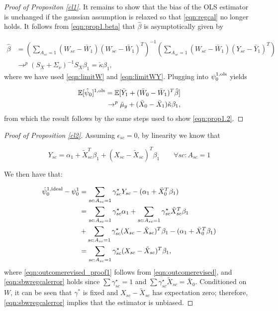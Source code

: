\begin{proof}[Proof of Propositon \ref{cl1}]
It remains to show that the bias of the OLS estimator is unchanged if the gaussian assumption is relaxed so that \eqref{eqn:regcal} no longer holds. It follows from \eqref{eqn:prop1.beta} that $\hat{\beta}$ is asymptotically given by

    \begin{align*}
    \hat{\beta} &= \left(\sum_{A_{sc}=1} (W_{sc} - \bar{W}_1)(W_{sc} - \bar{W}_1)^T \right)^{-1} \left(\sum_{A_{sc}=1} (W_{sc} - \bar{W}_1)(Y_{sc} - \bar{Y}_1)^T\right) \\
     & \rightarrow^p  (S_X + \Sigma_\nu)^{-1}S_X \beta_1 = \check{\kappa} \beta_1, 
    \end{align*}
where we have used \eqref{eqn:limitW} and \eqref{eqn:limitWY}. Plugging into $\psi_0^{1,\textup{ols}}$ yields

\begin{align*}    
    \mathbb{E}[\hat{\psi}_0]^{1,\textup{ols}} = \mathbb{E}[ \bar{Y}_1 + (\bar{W}_0 - \bar{W}_1)^T \hat{\beta}] \\
    \rightarrow^p  \bar{\mu}_y + (\bar{X}_0 - \bar{X}_1)\check{\kappa} \beta_1,
\end{align*}
from which the result follows by the same steps used to show \eqref{eqn:prop1.2}.

\end{proof}


\begin{proof}[Proof of Proposition \ref{cl2}]
Assuming $\epsilon_{sc} = 0$, by linearity we know that

\begin{equation}\label{eqn:outcomerevised}
Y_{sc} = \alpha_1 + \tilde{X}_{sc}^T\beta_1 + (X_{sc} - \tilde{X}_{sc})^T\beta_1 \qquad \forall sc: A_{sc} = 1
\end{equation}

We then have that:

\begin{align}\nonumber
    \hat{\psi}_0^{1,\textup{ideal}} - \psi_0^1 &= \sum_{sc: A_{sc} = 1}\gamma_{sc}^\star Y_{sc} - (\alpha_1 + \bar{X}_0^T\beta_1) \\
    \nonumber &= \sum_{sc: A_{sc} = 1}\gamma_{sc}^\star\alpha_1 + \sum_{sc: A_{sc} = 1}\gamma_{sc}^\star\tilde{X}_{sc}^T\beta_1 \\ 
    &+ \sum_{sc: A_{sc} = 1}\gamma_{sc}^\star(X_{sc} - \tilde{X}_{sc})^T\beta_1 - (\alpha_1 + \bar{X}_0^T\beta_1) \label{eqn:outcomerevised_proof1}\\
    &= \sum_{sc: A_{sc} = 1}\gamma_{sc}^\star(X_{sc} - \tilde{X}_{sc})^T\beta_1\label{eqn:sbwregcalerror},
\end{align}
where \eqref{eqn:outcomerevised_proof1} follows from \eqref{eqn:outcomerevised}, and \eqref{eqn:sbwregcalerror} holds since $\sum \gamma_{sc}^\star = 1$ and $\sum \gamma_{sc}^\star \tilde{X}_{sc} = \bar{X}_0$. Conditioned on $W$, it can be seen that $\gamma^*$ is fixed and $X_{sc} - \tilde{X}_{sc}$ has expectation zero; therefore, \eqref{eqn:sbwregcalerror} implies that the estimator is unbiased.
\end{proof}


